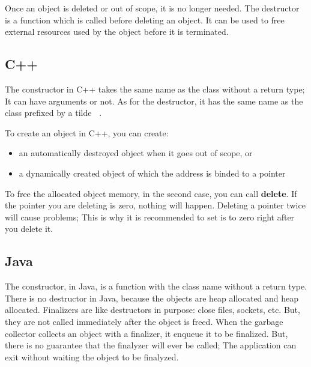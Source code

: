 \documentclass{KodeBook}
\begin{document}
Once an object is deleted or out of scope, it is no longer needed. 
The destructor is a function which is called before deleting an object.
It can be used to free external resources used by the object before it is terminated.

\subsection{C++}

The constructor in C++ takes the same name as the class without a return type;
It can have arguments or not.
As for the destructor, it has the same name as the class prefixed by a tilde \textbf{~}.



To create an object in C++, you can create:
\begin{itemize}
	\item an automatically destroyed object when it goes out of scope, or
	\item a dynamically created object of which the address is binded to a pointer
\end{itemize}



To free the allocated object memory, in the second case, you can call \textbf{delete}. 
If the pointer you are deleting is zero, nothing will happen. 
Deleting a pointer twice will cause problems; This is why it is recommended to set is to zero right after you delete it.



\subsection{Java}

The constructor, in Java, is a function with the class name without a return type.
There is no destructor in Java, because the objects are heap allocated and heap allocated. 
Finalizers are like destructors in purpose: close files, sockets, etc. 
But, they are not called immediately after the object is freed. 
When the garbage collector collects an object with a finalizer, it enqueue it to be finalized. 
But, there is no guarantee that the finalyzer will ever be called; The application can exit without waiting the object to be finalyzed. 
\end{document}

